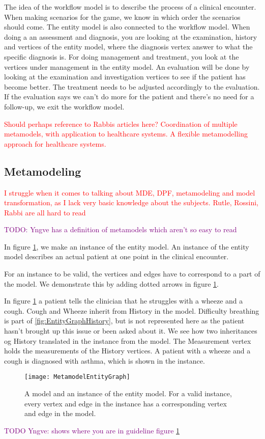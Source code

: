 The idea of the workflow model is to describe the process of a clinical encounter. When making scenarios for the game, we know in which order the scenarios should come. The entity model is also connected to the workflow model. When doing a an assessment and diagnosis, you are looking at the examination, history and vertices of the entity model, where the diagnosis vertex answer to what the specific diagnosis is. For doing management and treatment, you look at the vertices under management in the entity model. An evaluation will be done by looking at the examination and investigation vertices to see if the patient has become better. The treatment needs to be adjusted accordingly to the evaluation. If the evaluation says we can't do more for the patient and there's no need for a follow-up, we exit the workflow model.

\textcolor{red}{Should perhaps reference to Rabbis articles here? 
	Coordination	of multiple metamodels, with application	to healthcare systems.
A flexible metamodelling approach for healthcare systems. }

\subsection{Metamodeling}

\textcolor{red}{I struggle when it comes to talking about MDE, DPF, metamodeling and model transformation, as I lack very basic knowledge about the subjects. Rutle, Rossini, Rabbi are all hard to read}

\textcolor{purple}{TODO: Yngve has a definition of metamodels which aren't so easy to read}

In figure \ref{fig:MetamodelEntityGraph}, we make an instance of the entity model. An instance of the entity model describes an actual patient at one point in the clinical encounter. 

For an instance to be valid, the vertices and edges have to correspond to a part of the model. We demonstrate this by adding dotted arrows in figure \ref{fig:MetamodelEntityGraph}. 

In figure \ref{fig:MetamodelEntityGraph} a patient tells the clinician that he struggles with a wheeze and a cough. Cough and Wheeze inherit from History in the model. Difficulty breathing is part of \ref{fig:EntityGraphHistory}, but is not represented here as the patient hasn't brought up this issue or been asked about it. We see how two inheritances og History translated in the instance from the model. The Measurement vertex holds the measurements of the History vertices. A patient with a wheeze and a cough is diagnosed with asthma, which is shown in the instance.
\begin{figure}[h!]
	\caption {A model and an instance of the entity model. For a valid instance, every vertex and edge in the instance has a corresponding vertex and edge in the model.}
	\label{fig:MetamodelEntityGraph}
	\texttt{[image: MetamodelEntityGraph]}
\end{figure}
\textcolor{purple}{TODO Yngve: shows where you are in guideline figure \ref{fig:MetamodelEntityGraph}}

